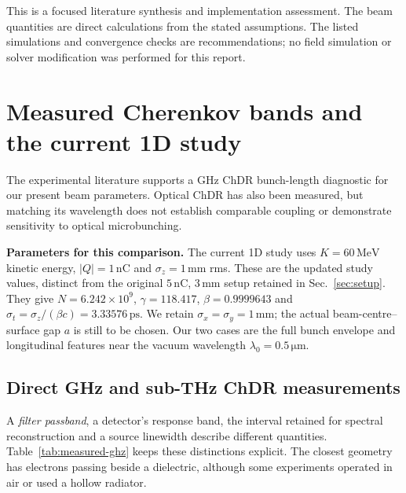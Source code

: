 \documentclass[11pt,a4paper]{article}
\newcommand{\unit}[1]{\,\mathrm{#1}}
\numberwithin{equation}{section}
\begin{document}
This is a focused literature synthesis and implementation assessment.
The beam quantities are direct calculations from the stated assumptions.
The listed simulations and convergence checks are recommendations;
no field simulation or solver modification was performed for this report.

\clearpage
\section{Measured Cherenkov bands and the current 1D study}
\label{sec:measurement-bands}

The experimental literature supports a GHz ChDR bunch-length diagnostic
for our present beam parameters. Optical ChDR has also been measured,
but matching its wavelength does not establish comparable coupling or
demonstrate sensitivity to optical microbunching.

\textbf{Parameters for this comparison.}
The current 1D study uses \(K=60\unit{MeV}\) kinetic energy,
\(|Q|=1\unit{nC}\) and \(\sigma_z=1\unit{mm}\) rms. These are the
updated study values, distinct from the original \(5\unit{nC}\),
\(3\unit{mm}\) setup retained in Sec.~\ref{sec:setup}.
They give \(N=6.242\times10^9\), \(\gamma=118.417\),
\(\beta=0.9999643\) and \(\sigma_t=\sigma_z/(\beta c)=3.33576\unit{ps}\).
We retain \(\sigma_x=\sigma_y=1\unit{mm}\); the actual beam-centre--surface
gap \(a\) is still to be chosen. Our two cases are the full bunch envelope
and longitudinal features near the vacuum wavelength
\(\lambda_0=0.5\unit{\mu m}\).

\subsection{Direct GHz and sub-THz ChDR measurements}

A \emph{filter passband}, a detector's response band, the interval retained
for spectral reconstruction and a source linewidth describe different
quantities. Table~\ref{tab:measured-ghz} keeps these distinctions explicit.
The closest geometry has electrons passing beside a dielectric, although
some experiments operated in air or used a hollow radiator.
\end{document}
